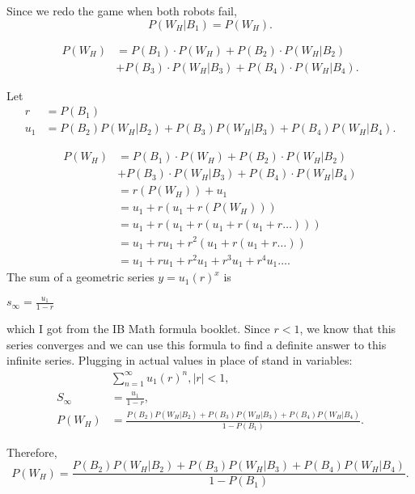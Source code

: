 \documentclass[11pt]{article}
\begin{document}
Since we redo the game when both robots fail,
\begin{equation*}
    P(W_H | B_1) = P(W_{H}).
\end{equation*} 

\begin{align*}
    P(W_H) &= P(B_{1}) \cdot P(W_{H}) + P(B_{2}) \cdot P(W_{H} | B_{2})\\
    &+ P(B_{3}) \cdot P(W_{H} | B_{3}) + P(B_{4}) \cdot P(W_{H} | B_{4}).
\end{align*}

Let
\begin{align*}
    r &= P(B_1)\\
    u_1 &= P(B_2)P(W_H | B_2) + P(B_3)P(W_H | B_3) + P(B_4)P(W_H | B_4).
\end{align*}



\begin{align*}
    P(W_H) &= P(B_{1}) \cdot P(W_{H}) + P(B_{2}) \cdot P(W_{H} | B_{2})\\
    &+ P(B_{3}) \cdot P(W_{H} | B_{3}) + P(B_{4}) \cdot P(W_{H} | B_{4})\\
    &= r(P(W_{H})) + u_1\\
    &= u_1 + r(u_1 + r(P(W_{H})))\\
    &= u_1 + r(u_1 + r(u_1 + r(u_1 + r\dots)))\\
    &= u_1 + ru_1 + r^2(u_1 + r(u_1 + r\dots))\\
    &= u_1 + ru_1 + r^2 u_1 + r^3 u_1 + r^4 u_1\dots.
\end{align*}
The sum of a geometric series \(y = u_1 (r)^x \) is

\(s_{\infty} = \frac{u_1}{1-r}\)

which I got from the IB Math formula booklet. Since \(r < 1 \), we know that this
series converges and we can use this formula to find a definite answer to this infinite series.
Plugging in actual values in place of stand in variables:
\begin{align*}
    &\sum_{n=1}^\infty u_1(r)^n, |r| < 1,\\
    S_\infty&= \frac{u_1}{1-r},\\
    P(W_H) &= \frac{P(B_2)P(W_H | B_2) + P(B_3)P(W_H | B_3) + P(B_4)P(W_H | B_4)}{1-P(B_1)}.
\end{align*}

Therefore,
\begin{equation*}
    P(W_{H}) = \frac{P(B_2)P(W_H | B_2) + P(B_3)P(W_H | B_3) + P(B_4)P(W_H | B_4)}{1-P(B_1)}.
\end{equation*}
\end{document}
